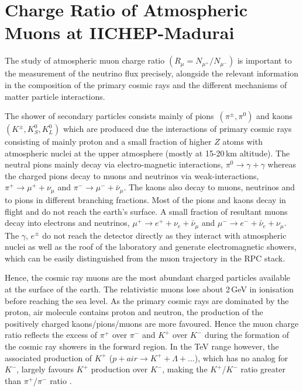 
\chapter{Charge Ratio of Atmospheric Muons at IICHEP-Madurai}


The study of atmospheric muon charge ratio
$\left(R_{\mu}=N_{\mu^{+}}/N_{\mu^{-}}\right)$
is important to the measurement of the neutrino flux precisely,
alongside the relevant information in the composition of the primary
cosmic rays and the different mechanisms of matter particle
interactions.

The shower of secondary particles consists mainly of
\mbox{pions $\left(\pi^{\pm}, \pi^0\right)$} and
\mbox{kaons $\left(K^{\pm}, K^0_S, K^0_L\right)$} which are produced due
the interactions of primary cosmic rays consisting of mainly proton
and a small fraction of higher $Z$ atoms \cite{cosmic1,pdgspectra1}
with atmospheric nuclei at the upper atmosphere (mostly at 15-20\,km
altitude).
The neutral pions mainly decay via electro-magnetic interactions,
$\pi^0 \rightarrow \gamma+\gamma$ whereas the charged pions decay to
muons and neutrinos via weak-interactions,
$\pi^+ \rightarrow \mu^+ + \nu_{\mu}$ and
$\pi^- \rightarrow \mu^- + \bar{\nu}_{\mu}$. The kaons also decay to
muons, neutrinos and to pions in different branching fractions.
Most of the pions and kaons decay in flight and do not reach the
earth's surface.
A small fraction of resultant muons decay into electrons and neutrinos,
$\mu^+ \rightarrow e^+ + \nu_{e} + \bar{\nu}_{\mu}$ and
$\mu^- \rightarrow e^- + \bar{\nu}_{e} + \nu_{\mu}$.
The $\gamma$, $e^{\pm}$ do not reach the detector directly as they
interact with atmospheric nuclei as well as the roof of the laboratory
and generate electromagnetic showers, which can be easily distinguished
from the muon trajectory in the RPC stack.

Hence, the cosmic ray muons are the most abundant charged particles
available at the surface of the earth. The relativistic muons lose
about 2\,GeV in ionisation before reaching the sea level.
As the primary cosmic rays are dominated by the proton, air molecule
  contains proton and neutron, the production of the positively
  charged kaons/pions/muons are more favoured.
Hence the muon charge ratio reflects the excess of $\pi^{+}$ over
$\pi^{-}$ and $K^{+}$ over $K^{-}$ during the formation of the
cosmic ray showers in the forward region. In the TeV range however,
the associated production of $K^{+}$
($p+air \rightarrow K^{+} + \Lambda + ...$), which has no analog for $K^{-}$,
largely favours $K^{+}$ production over $K^{-}$, making the
$K^{+}$/$K^{-}$ ratio greater than $\pi^{+}$/$\pi^{-}$ ratio
\cite{adamson2007}.

